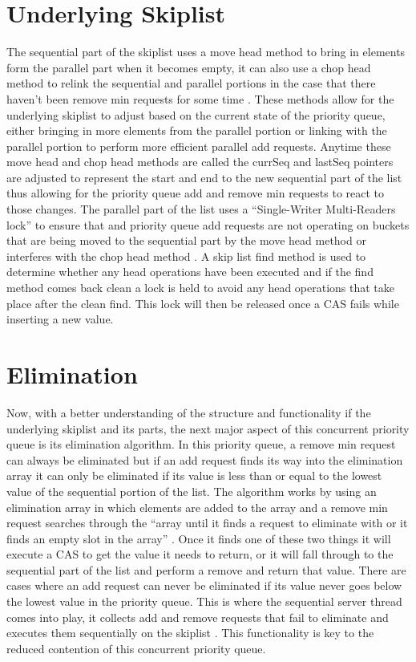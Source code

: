 \documentclass[10pt]{asme2ej}
\begin{document}
\section{Underlying Skiplist}
The sequential part of the skiplist uses a move head method to bring in elements form the parallel part when it becomes empty, it can also use a chop head method to relink the sequential and parallel portions in the case that there haven’t been remove min requests for some time \cite{latex}. These methods allow for the underlying skiplist to adjust based on the current state of the priority queue, either bringing in more elements from the parallel portion or linking with the parallel portion to perform more efficient parallel add requests. Anytime these move head and chop head methods are called the currSeq and lastSeq pointers are adjusted to represent the start and end to the new sequential part of the list thus allowing for the priority queue add and remove min requests to react to those changes. The parallel part of the list uses a “Single-Writer Multi-Readers lock” to ensure that and priority queue add requests are not operating on buckets that are being moved to the sequential part by the move head method or interferes with the chop head method \cite{latex}. A skip list find method is used to determine whether any head operations have been executed and if the find method comes back clean a lock is held to avoid any head operations that take place after the clean find. This lock will then be released once a CAS fails while inserting a new value.
\section{Elimination}
Now, with a better understanding of the structure and functionality if the underlying skiplist and its parts, the next major aspect of this concurrent priority queue is its elimination algorithm. In this priority queue, a remove min request can always be eliminated but if an add request finds its way into the elimination array it can only be eliminated if its value is less than or equal to the lowest value of the sequential portion of the list. The algorithm works by using an elimination array in which elements are added to the array and a remove min request searches through the “array until it finds a request to eliminate with or it finds an empty slot in the array” \cite{latex}. Once it finds one of these two things it will execute a CAS to get the value it needs to return, or it will fall through to the sequential part of the list and perform a remove and return that value. There are cases where an add request can never be eliminated if its value never goes below the lowest value in the priority queue. This is where the sequential server thread comes into play, it collects add and remove requests that fail to eliminate and executes them sequentially on the skiplist \cite{latex}. This functionality is key to the reduced contention of this concurrent priority queue.
\end{document}
